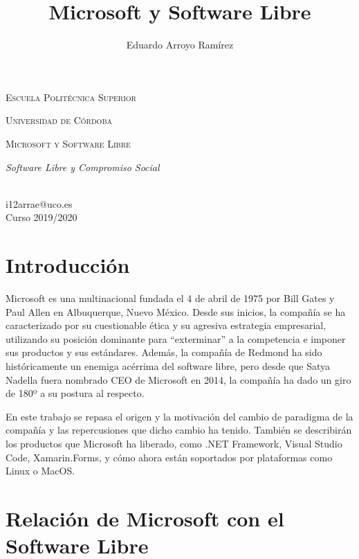 \documentclass[10pt, titlepage]{article}
\title{Microsoft y Software Libre}
\author{Eduardo Arroyo Ramírez}
\begin{document}

\makeatletter
\begin{titlepage}
    \begin{center}
        {\scshape\Large Escuela Politécnica Superior \par}
        \vspace{0.5cm}
        {\scshape\large Universidad de Córdoba \par}
        \vspace{6cm}
        {\scshape\Huge Microsoft y Software Libre \par}
        \vspace{0.5cm}
        {\itshape\Large Software Libre y Compromiso Social \par}
    \end{center}
    \vspace{11cm}
    \begin{flushright}
        \@author\space \\
        i12arrae@uco.es \\
        Curso 2019/2020
    \end{flushright}
\end{titlepage}

\tableofcontents
\listoffigures
\listoftables
\clearpage

\justify
\section{Introducción}
Microsoft es una multinacional fundada el 4 de abril de 1975 por Bill Gates y Paul Allen en Albuquerque, Nuevo México. Desde sus inicios, la compañía se ha caracterizado por su cuestionable ética y su agresiva estrategia empresarial, utilizando su posición dominante para ``exterminar'' a la competencia e imponer sus productos y sus estándares. Además, la compañía de Redmond ha sido históricamente un enemiga acérrima del software libre, pero desde que Satya Nadella fuera nombrado CEO de Microsoft en 2014, la compañía ha dado un giro de 180º a su postura al respecto.

En este trabajo se repasa el origen y la motivación del cambio de paradigma de la compañía y las repercusiones que dicho cambio ha tenido. También se describirán los productos que Microsoft ha liberado, como .NET Framework, Visual Studio Code, Xamarin.Forms, y cómo ahora están soportados por plataformas como Linux o MacOS.

\section{Relación de Microsoft con el Software Libre}
\end{document}
